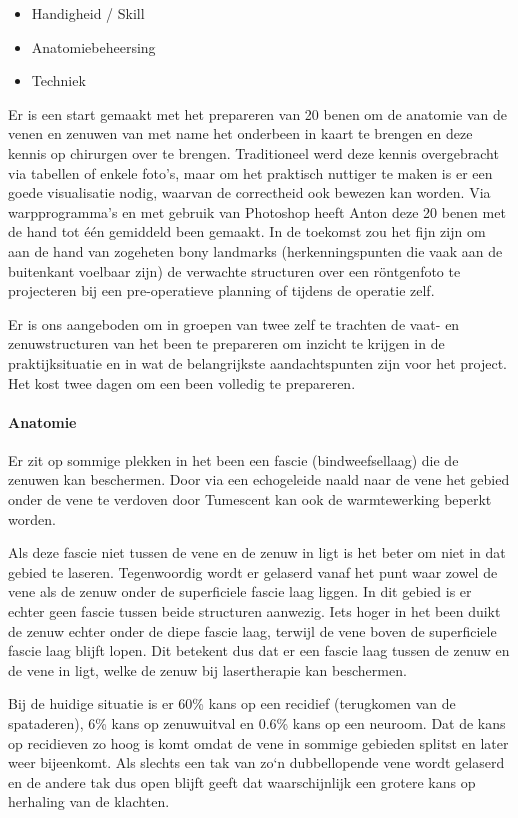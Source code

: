 \begin{itemize}
	\item Handigheid / Skill 
	\item Anatomiebeheersing 
	\item Techniek 
\end{itemize}

Er is een start gemaakt met het prepareren van 20 benen om de anatomie van de venen en zenuwen van met name het onderbeen in kaart te brengen en deze kennis op chirurgen over te brengen.
Traditioneel werd deze kennis overgebracht via tabellen of enkele foto's, maar om het praktisch nuttiger te maken is er een goede visualisatie nodig, waarvan de correctheid ook bewezen kan worden.
Via warpprogramma's en met gebruik van Photoshop heeft Anton deze 20 benen met de hand tot \'e\'en gemiddeld been gemaakt.
In de toekomst zou het fijn zijn om aan de hand van zogeheten bony landmarks (herkenningspunten die vaak aan de buitenkant voelbaar zijn) de verwachte structuren over een r\"ontgenfoto te projecteren bij een pre-operatieve planning of tijdens de operatie zelf. 

Er is ons aangeboden om in groepen van twee zelf te trachten de vaat- en zenuwstructuren van het been te prepareren om inzicht te krijgen in de praktijksituatie en in wat de belangrijkste aandachtspunten zijn voor het project. Het kost twee dagen om een been volledig te prepareren. 

\paragraph{Anatomie}
Er zit op sommige plekken in het been een fascie (bindweefsellaag) die de zenuwen kan beschermen.
Door via een echogeleide naald naar de vene het gebied onder de vene te verdoven door Tumescent kan ook de warmtewerking beperkt worden.

Als deze fascie niet tussen de vene en de zenuw in ligt is het beter om niet in dat gebied te laseren.
Tegenwoordig wordt er gelaserd vanaf het punt waar zowel de vene als de zenuw onder de superficiele fascie laag liggen.
In dit gebied is er echter geen fascie tussen beide structuren aanwezig.
Iets hoger in het been duikt de zenuw echter onder de diepe fascie laag, terwijl de vene boven de superficiele fascie laag blijft lopen.
Dit betekent dus dat er een fascie laag tussen de zenuw en de vene in ligt, welke de zenuw bij lasertherapie kan beschermen.

Bij de huidige situatie is er 60\% kans op een recidief (terugkomen van de spataderen), 6\% kans op zenuwuitval en 0.6\% kans op een neuroom.
Dat de kans op recidieven zo hoog is komt omdat de vene in sommige gebieden splitst en later weer bijeenkomt.
Als slechts een tak van zo`n dubbellopende vene wordt gelaserd en de andere tak dus open blijft geeft dat waarschijnlijk een grotere kans op herhaling van de klachten. 


